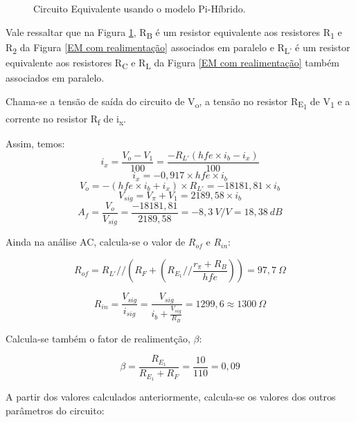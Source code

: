 \documentclass[journal, a4paper]{IEEEtran}
\begin{document}
        \begin{figure}[H]
	
	    \hspace{-1.2 cm}	
    	
    	
	    \caption{Circuito Equivalente usando o modelo Pi-Híbrido.}
	    
	    \label{modelo pi}
    \end{figure}
    
    \tab Vale ressaltar que na Figura \ref{modelo pi}, R\textsubscript{B} é um resistor equivalente aos resistores R\textsubscript{1} e R\textsubscript{2} da Figura \ref{EM com realimentação} associados em paralelo e R\textsubscript{L'} é um resistor equivalente aos resistores R\textsubscript{C} e R\textsubscript{L} da Figura \ref{EM com realimentação} também associados em paralelo.
    
    \tab Chama-se a tensão de saída do circuito de V\textsubscript{o}, a tensão no resistor R\textsubscript{E\textsubscript{1}} de V\textsubscript{1} e a corrente no resistor R\textsubscript{f} de i\textsubscript{x}.
    
    \tab Assim, temos:
    $$ i_x = \frac{V_o - V_1}{100} = \frac{-R_{L'}( hfe \times i_b - i_x)}{100} $$
    $$i_x = -0,917 \times hfe \times i_b$$
    $$ V_o = -(hfe \times i_b + i_x) \times R_{L'} = -18181,81 \times i_b$$
    $$ V_{sig} = V_{\pi} + V_1 = 2189,58 \times i_b $$
    $$ A_f = \frac{V_o}{V_{sig}} = \frac{-18181,81}{2189,58} = -8,3 \: V/V = 18,38 \: dB $$
    
    \tab Ainda na análise AC, calcula-se o valor de $R_{of}$ e $R_{in}$:
    
    $$ R_{of} = R_{L'} // \left( R_F + \left( R_{E_1} //  \frac{r_{\pi}+R_B}{hfe}  \right) \right) = 97,7 \: \Omega $$
    
    $$ R_{in} = \frac{V_{sig}}{i_{sig}} = \frac{V_{sig}}{i_b + \frac{V_{sig}}{R_B}} = 1299,6 \approx 1300 \: \Omega $$
    
    \tab Calcula-se também o fator de realimentção, $\beta$:
    
    $$ \beta = \frac{R_{E_1}}{R_{E_1} + R_F} = \frac{10}{110} =  0,09 $$
    
    \tab A partir dos valores calculados anteriormente, calcula-se os valores dos outros parâmetros do circuito:
    
\end{document}
